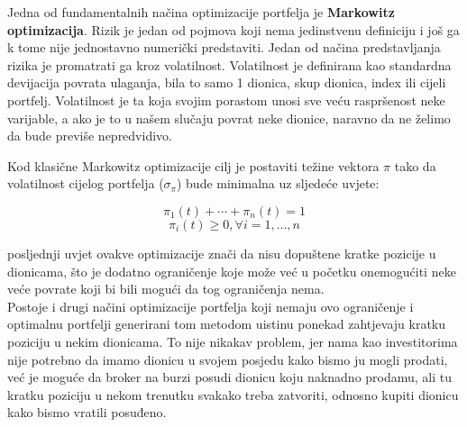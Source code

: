 \documentclass[times, utf8, seminar]{fer}
\begin{document}
Jedna od fundamentalnih načina optimizacije portfelja je \textbf{Markowitz optimizacija}. Rizik je jedan od pojmova koji nema jedinstvenu definiciju i još ga k tome nije jednostavno numerički predstaviti. Jedan od načina predstavljanja rizika je promatrati ga kroz volatilnost. Volatilnost je definirana kao standardna devijacija povrata ulaganja, bila to samo 1 dionica, skup dionica, index ili cijeli portfelj. Volatilnost je ta koja svojim porastom unosi sve veću raspršenost neke varijable, a ako je to u našem slučaju povrat neke dionice, naravno da ne želimo da bude previše nepredvidivo.

Kod klasične Markowitz optimizacije cilj je postaviti težine vektora $\pi$ tako da volatilnost cijelog portfelja ($\sigma_{\pi}$) bude minimalna uz sljedeće uvjete:

\[ \pi_1(t) + \cdots + \pi_n(t) = 1 \]
\[ \pi_i(t) \geq 0, \forall i = 1,...,n \]

posljednji uvjet ovakve optimizacije znači da nisu dopuštene kratke pozicije u dionicama, što je dodatno ograničenje koje može već u početku onemogućiti neke veće povrate koji bi bili mogući da tog ograničenja nema. \\

Postoje i drugi načini optimizacije portfelja koji nemaju ovo ograničenje i optimalnu portfelji generirani tom metodom uistinu ponekad zahtjevaju kratku poziciju u nekim dionicama. To nije nikakav problem, jer nama kao investitorima nije potrebno da imamo dionicu u svojem posjedu kako bismo ju mogli prodati, već je moguće da broker na burzi posudi dionicu koju naknadno prodamu, ali tu kratku poziciju u nekom trenutku svakako treba zatvoriti, odnosno kupiti dionicu kako bismo vratili posuđeno.
\end{document}
